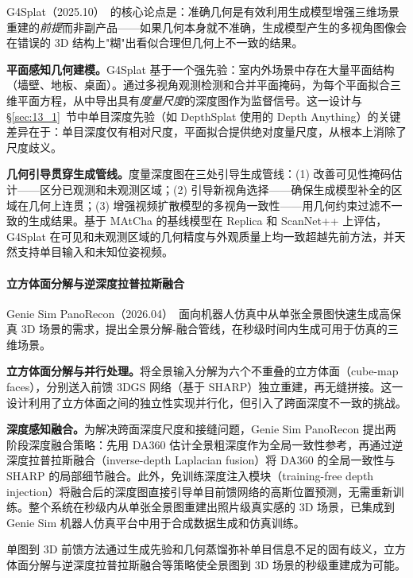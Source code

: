 G4Splat（2025.10）~\cite{2510_12099}的核心论点是：准确几何是有效利用生成模型增强三维场景重建的\emph{前提}而非副产品——如果几何本身就不准确，生成模型产生的多视角图像会在错误的 3D 结构上"糊"出看似合理但几何上不一致的结果。

\textbf{平面感知几何建模。}G4Splat 基于一个强先验：室内外场景中存在大量平面结构（墙壁、地板、桌面）。通过多视角观测检测和合并平面掩码，为每个平面拟合三维平面方程，从中导出具有\emph{度量尺度}的深度图作为监督信号。这一设计与 §\ref{sec:13_1}~节中单目深度先验（如 DepthSplat 使用的 Depth Anything）的关键差异在于：单目深度仅有相对尺度，平面拟合提供绝对度量尺度，从根本上消除了尺度歧义。

\textbf{几何引导贯穿生成管线。}度量深度图在三处引导生成管线：(1) 改善可见性掩码估计——区分已观测和未观测区域；(2) 引导新视角选择——确保生成模型补全的区域在几何上连贯；(3) 增强视频扩散模型的多视角一致性——用几何约束过滤不一致的生成结果。基于 MAtCha 的基线模型在 Replica 和 ScanNet++ 上评估，G4Splat 在可见和未观测区域的几何精度与外观质量上均一致超越先前方法，并天然支持单目输入和未知位姿视频。

\paragraph{立方体面分解与逆深度拉普拉斯融合}

Genie Sim PanoRecon（2026.04）~\cite{2604_07105}面向机器人仿真中从单张全景图快速生成高保真 3D 场景的需求，提出全景分解-融合管线，在秒级时间内生成可用于仿真的三维场景。

\textbf{立方体面分解与并行处理。}将全景输入分解为六个不重叠的立方体面（cube-map faces），分别送入前馈 3DGS 网络（基于 SHARP）独立重建，再无缝拼接。这一设计利用了立方体面之间的独立性实现并行化，但引入了跨面深度不一致的挑战。

\textbf{深度感知融合。}为解决跨面深度尺度和接缝问题，Genie Sim PanoRecon 提出两阶段深度融合策略：先用 DA360 估计全景粗深度作为全局一致性参考，再通过逆深度拉普拉斯融合（inverse-depth Laplacian fusion）将 DA360 的全局一致性与 SHARP 的局部细节融合。此外，免训练深度注入模块（training-free depth injection）将融合后的深度图直接引导单目前馈网络的高斯位置预测，无需重新训练。整个系统在秒级内从单张全景图重建出照片级真实感的 3D 场景，已集成到 Genie Sim 机器人仿真平台中用于合成数据生成和仿真训练。

\begin{takeaway}
单图到 3D 前馈方法通过生成先验和几何蒸馏弥补单目信息不足的固有歧义，立方体面分解与逆深度拉普拉斯融合等策略使全景图到 3D 场景的秒级重建成为可能。
\end{takeaway}

